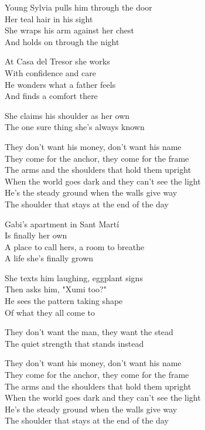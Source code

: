 \begin{lyrics}
Young Sylvia pulls him through the door\\
Her teal hair in his sight\\
She wraps his arm against her chest\\
And holds on through the night

At Casa del Tresor she works\\
With confidence and care\\
He wonders what a father feels\\
And finds a comfort there

She claims his shoulder as her own\\
The one sure thing she's always known

They don't want his money, don't want his name\\
They come for the anchor, they come for the frame\\
The arms and the shoulders that hold them upright\\
When the world goes dark and they can't see the light\\
He's the steady ground when the walls give way\\
The shoulder that stays at the end of the day

Gabi's apartment in Sant Martí\\
Is finally her own\\
A place to call hers, a room to breathe\\
A life she's finally grown

She texts him laughing, eggplant signs\\
Then asks him, "Xumi too?"\\
He sees the pattern taking shape\\
Of what they all come to

They don't want the man, they want the stead\\
The quiet strength that stands instead

They don't want his money, don't want his name\\
They come for the anchor, they come for the frame\\
The arms and the shoulders that hold them upright\\
When the world goes dark and they can't see the light\\
He's the steady ground when the walls give way\\
The shoulder that stays at the end of the day


\end{lyrics}
